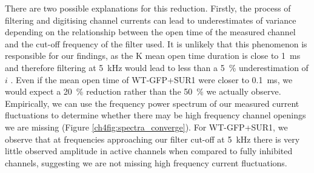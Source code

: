 There are two possible explanations for this reduction.
Firstly, the process of filtering and digitising channel currents can lead to underestimates of variance depending on the relationship between the open time of the measured channel and the cut-off frequency of the filter used.
It is unlikely that this phenomenon is responsible for our findings, as the K\ATP{} mean open time duration is close to \SI{1}{\milli\second} and therefore filtering at \SI{5}{\kilo\hertz} would lead to less than a \SI{5}{\percent} underestimation of $i$ \cite{alvarez_counting_2002}.
Even if the mean open time of WT-GFP+SUR1 were closer to \SI{0.1}{\milli\second}, we would expect a \SI{20}{\percent} reduction rather than the \SI{50}{\percent} we actually observe.
Empirically, we can use the frequency power spectrum of our measured current fluctuations to determine whether there may be high frequency channel openings we are missing (Figure \ref{ch4fig:spectra_converge}).
For WT-GFP+SUR1, we observe that at frequencies approaching our filter cut-off at \SI{5}{\kilo\hertz} there is very little observed amplitude in active channels when compared to fully inhibited channels, suggesting we are not missing high frequency current fluctuations.

